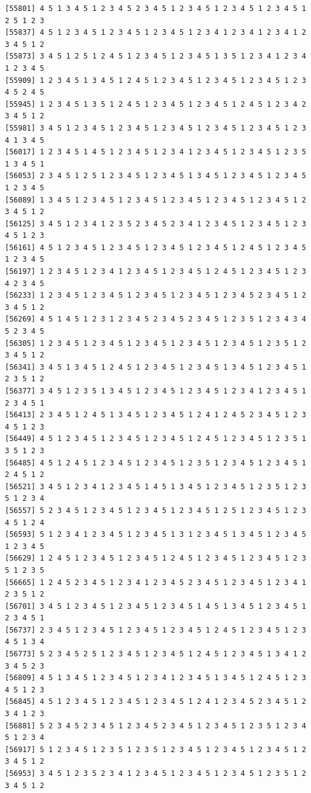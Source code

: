 \documentclass[
  11pt,
]{book}
\begin{document}
\begin{verbatim}
[55801] 4 5 1 3 4 5 1 2 3 4 5 2 3 4 5 1 2 3 4 5 1 2 3 4 5 1 2 3 4 5 1 2 5 1 2 3
[55837] 4 5 1 2 3 4 5 1 2 3 4 5 1 2 3 4 5 1 2 3 4 1 2 3 4 1 2 3 4 1 2 3 4 5 1 2
[55873] 3 4 5 1 2 5 1 2 4 5 1 2 3 4 5 1 2 3 4 5 1 3 5 1 2 3 4 1 2 3 4 1 2 3 4 5
[55909] 1 2 3 4 5 1 3 4 5 1 2 4 5 1 2 3 4 5 1 2 3 4 5 1 2 3 4 5 1 2 3 4 5 2 4 5
[55945] 1 2 3 4 5 1 3 5 1 2 4 5 1 2 3 4 5 1 2 3 4 5 1 2 4 5 1 2 3 4 2 3 4 5 1 2
[55981] 3 4 5 1 2 3 4 5 1 2 3 4 5 1 2 3 4 5 1 2 3 4 5 1 2 3 4 5 1 2 3 4 1 3 4 5
[56017] 1 2 3 4 5 1 4 5 1 2 3 4 5 1 2 3 4 1 2 3 4 5 1 2 3 4 5 1 2 3 5 1 3 4 5 1
[56053] 2 3 4 5 1 2 5 1 2 3 4 5 1 2 3 4 5 1 3 4 5 1 2 3 4 5 1 2 3 4 5 1 2 3 4 5
[56089] 1 3 4 5 1 2 3 4 5 1 2 3 4 5 1 2 3 4 5 1 2 3 4 5 1 2 3 4 5 1 2 3 4 5 1 2
[56125] 3 4 5 1 2 3 4 1 2 3 5 2 3 4 5 2 3 4 1 2 3 4 5 1 2 3 4 5 1 2 3 4 5 1 2 3
[56161] 4 5 1 2 3 4 5 1 2 3 4 5 1 2 3 4 5 1 2 3 4 5 1 2 4 5 1 2 3 4 5 1 2 3 4 5
[56197] 1 2 3 4 5 1 2 3 4 1 2 3 4 5 1 2 3 4 5 1 2 4 5 1 2 3 4 5 1 2 3 4 2 3 4 5
[56233] 1 2 3 4 5 1 2 3 4 5 1 2 3 4 5 1 2 3 4 5 1 2 3 4 5 2 3 4 5 1 2 3 4 5 1 2
[56269] 4 5 1 4 5 1 2 3 1 2 3 4 5 2 3 4 5 2 3 4 5 1 2 3 5 1 2 3 4 3 4 5 2 3 4 5
[56305] 1 2 3 4 5 1 2 3 4 5 1 2 3 4 5 1 2 3 4 5 1 2 3 4 5 1 2 3 5 1 2 3 4 5 1 2
[56341] 3 4 5 1 3 4 5 1 2 4 5 1 2 3 4 5 1 2 3 4 5 1 3 4 5 1 2 3 4 5 1 2 3 5 1 2
[56377] 3 4 5 1 2 3 5 1 3 4 5 1 2 3 4 5 1 2 3 4 5 1 2 3 4 1 2 3 4 5 1 2 3 4 5 1
[56413] 2 3 4 5 1 2 4 5 1 3 4 5 1 2 3 4 5 1 2 4 1 2 4 5 2 3 4 5 1 2 3 4 5 1 2 3
[56449] 4 5 1 2 3 4 5 1 2 3 4 5 1 2 3 4 5 1 2 4 5 1 2 3 4 5 1 2 3 5 1 3 5 1 2 3
[56485] 4 5 1 2 4 5 1 2 3 4 5 1 2 3 4 5 1 2 3 5 1 2 3 4 5 1 2 3 4 5 1 2 4 5 1 2
[56521] 3 4 5 1 2 3 4 1 2 3 4 5 1 4 5 1 3 4 5 1 2 3 4 5 1 2 3 5 1 2 3 5 1 2 3 4
[56557] 5 2 3 4 5 1 2 3 4 5 1 2 3 4 5 1 2 3 4 5 1 2 5 1 2 3 4 5 1 2 3 4 5 1 2 4
[56593] 5 1 2 3 4 1 2 3 4 5 1 2 3 4 5 1 3 1 2 3 4 5 1 3 4 5 1 2 3 4 5 1 2 3 4 5
[56629] 1 2 4 5 1 2 3 4 5 1 2 3 4 5 1 2 4 5 1 2 3 4 5 1 2 3 4 5 1 2 3 5 1 2 3 5
[56665] 1 2 4 5 2 3 4 5 1 2 3 4 1 2 3 4 5 2 3 4 5 1 2 3 4 5 1 2 3 4 1 2 3 5 1 2
[56701] 3 4 5 1 2 3 4 5 1 2 3 4 5 1 2 3 4 5 1 4 5 1 3 4 5 1 2 3 4 5 1 2 3 4 5 1
[56737] 2 3 4 5 1 2 3 4 5 1 2 3 4 5 1 2 3 4 5 1 2 4 5 1 2 3 4 5 1 2 3 4 5 1 3 4
[56773] 5 2 3 4 5 2 5 1 2 3 4 5 1 2 3 4 5 1 2 4 5 1 2 3 4 5 1 3 4 1 2 3 4 5 2 3
[56809] 4 5 1 3 4 5 1 2 3 4 5 1 2 3 4 1 2 3 4 5 1 3 4 5 1 2 4 5 1 2 3 4 5 1 2 3
[56845] 4 5 1 2 3 4 5 1 2 3 4 5 1 2 3 4 5 1 2 4 1 2 3 4 5 2 3 4 5 1 2 3 4 1 2 3
[56881] 5 2 3 4 5 2 3 4 5 1 2 3 4 5 2 3 4 5 1 2 3 4 5 1 2 3 5 1 2 3 4 5 1 2 3 4
[56917] 5 1 2 3 4 5 1 2 3 5 1 2 3 5 1 2 3 4 5 1 2 3 4 5 1 2 3 4 5 1 2 3 4 5 1 2
[56953] 3 4 5 1 2 3 5 2 3 4 1 2 3 4 5 1 2 3 4 5 1 2 3 4 5 1 2 3 5 1 2 3 4 5 1 2

\end{verbatim}
\end{document}
